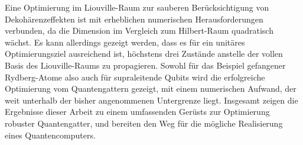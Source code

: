 Eine Optimierung im Liouville-Raum zur sauberen Berücksichtigung von
Dekohärenzeffekten ist mit erheblichen numerischen Herausforderungen verbunden,
da die Dimension im Vergleich zum Hilbert-Raum quadratisch wächst. Es kann
allerdings gezeigt werden, dass es für ein unitäres Optimierungsziel
ausreichend ist, höchstens drei Zustände anstelle der vollen Basis des
Liouville-Raums zu propagieren. Sowohl für das Beispiel gefangener Rydberg-Atome
also auch für supraleitende Qubits wird die erfolgreiche Optimierung vom
Quantengattern gezeigt, mit einem numerischen Aufwand, der weit unterhalb der
bisher angenommenen Untergrenze liegt. Insgesamt zeigen die Ergebnisse dieser
Arbeit zu einem umfassenden Gerüsts zur Optimierung robuster Quantengatter, und
bereiten den Weg für die mögliche Realisierung eines Quantencomputers.
